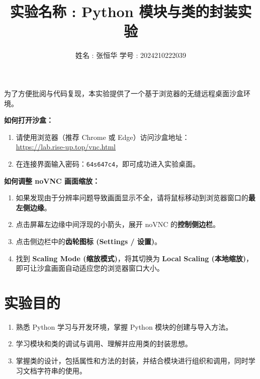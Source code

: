 \documentclass[12pt,a4paper]{ctexart}
\title{\vspace{-2cm} \textbf{实验名称 : Python 模块与类的封装实验}}
\author{姓名 : 张恒华 \quad 学号 : 2024210222039}
\begin{document}
	
	\maketitle
	
	\begin{tcolorbox}[colback=gray!5,colframe=gray!50!black,title=\textbf{实验复现沙盒使用提示}]
		为了方便批阅与代码复现，本实验提供了一个基于浏览器的无缝远程桌面沙盒环境。
		
		\textbf{如何打开沙盒：}
		\begin{enumerate}
			\item 请使用浏览器（推荐 Chrome 或 Edge）访问沙盒地址：\\
			\url{https://lab.rise-up.top/vnc.html}
			\item 在连接界面输入密码：\texttt{64s647c4}，即可成功进入实验桌面。
		\end{enumerate}
		
		\textbf{如何调整 noVNC 画面缩放：}
		\begin{enumerate}
			\item 如果发现由于分辨率问题导致画面显示不全，请将鼠标移动到浏览器窗口的\textbf{最左侧边缘}。
			\item 点击屏幕左边缘中间浮现的小箭头，展开 noVNC 的\textbf{控制侧边栏}。
			\item 点击侧边栏中的\textbf{齿轮图标 (Settings / 设置)}。
			\item 找到 \textbf{Scaling Mode (缩放模式)}，将其切换为 \textbf{Local Scaling (本地缩放)}，即可让沙盒画面自动适应您的浏览器窗口大小。
		\end{enumerate}
	\end{tcolorbox}
	
	\vspace{1em}
	
	\section{实验目的}
	\begin{enumerate}
		\item 熟悉 Python 学习与开发环境，掌握 Python 模块的创建与导入方法。
		\item 学习模块和类的调试与调用、理解并应用类的封装思想。
		\item 掌握类的设计，包括属性和方法的封装，并结合模块进行组织和调用，同时学习文档字符串的使用。
	\end{enumerate}
	
\end{document}
